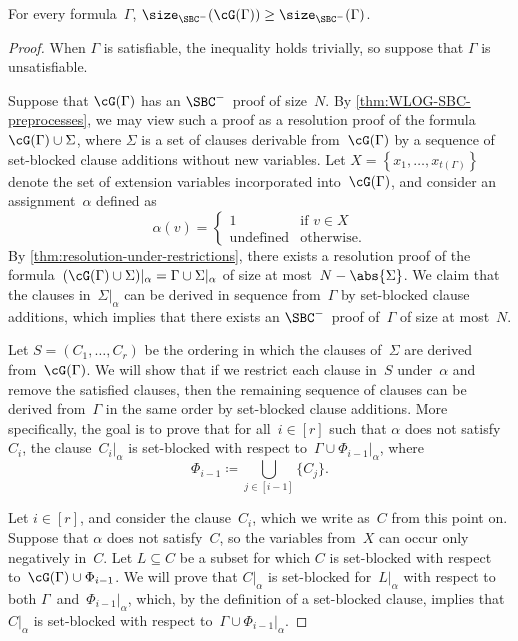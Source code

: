 \documentclass[10pt,a4paper]{article}
\begin{document}
\begin{lemma}\label{thm:projection-hard-for-SBC}
  For every formula~$\Gamma$,
  $\size_{\SBC^-}(\cG(\Gamma)) \geq \size_{\SBC^-}(\Gamma)$.
\end{lemma}
\begin{proof}
  When $\Gamma$ is satisfiable, the inequality holds trivially,
  so suppose that $\Gamma$ is unsatisfiable.

  Suppose that $\cG(\Gamma)$ has an $\SBC^-$~proof of size~$N$.
  By \cref{thm:WLOG-SBC-preprocesses}, we may view such a proof
  as a resolution proof of the formula~$\cG(\Gamma) \cup \Sigma$,
  where $\Sigma$ is a set of clauses derivable from~$\cG(\Gamma)$
  by a sequence of set-blocked clause additions without new variables.
  Let $X = \left\{x_1, \dots, x_{t(\Gamma)}\right\}$
  denote the set of extension variables incorporated into~$\cG(\Gamma)$,
  and consider an assignment~$\alpha$ defined as
  \begin{equation*}
    \alpha(v) =
    \begin{cases}
      1 & \text{if } v \in X \\
      \text{undefined} & \text{otherwise}.
    \end{cases}
  \end{equation*}
  By \cref{thm:resolution-under-restrictions}, there exists a resolution proof
  of the formula~$(\cG(\Gamma) \cup \Sigma)|_\alpha = \Gamma \cup \Sigma|_\alpha$
  of size at most~$N - \abs{\Sigma}$.
  We claim that the clauses in~$\Sigma|_\alpha$ can be derived
  in sequence from~$\Gamma$ by set-blocked clause additions,
  which implies that there exists
  an $\SBC^-$~proof of~$\Gamma$ of size at most~$N$.

  Let $S = (C_1, \dots, C_r)$ be the ordering in which
  the clauses of~$\Sigma$ are derived from~$\cG(\Gamma)$.
  We will show that if we restrict each clause in~$S$ under~$\alpha$
  and remove the satisfied clauses, then the remaining sequence of clauses
  can be derived from~$\Gamma$ in the same order by set-blocked clause additions.
  More specifically, the goal is to prove that for all~$i \in [r]$
  such that $\alpha$ does not satisfy~$C_i$,
  the clause~$C_i|_\alpha$ is set-blocked
  with respect to~$\Gamma \cup \Phi_{i - 1}|_\alpha$, where
  \begin{equation*}
    \Phi_{i - 1} \coloneqq \bigcup_{j \in [i - 1]} \{C_j\}.
  \end{equation*}

  Let $i \in [r]$, and consider the clause~$C_i$,
  which we write as~$C$ from this point on.
  Suppose that $\alpha$ does not satisfy~$C$,
  so the variables from~$X$ can occur only negatively in~$C$.
  Let $L \subseteq C$ be a subset for which $C$ is set-blocked
  with respect to~$\cG(\Gamma) \cup \Phi_{i - 1}$.
  We will prove that $C|_\alpha$ is set-blocked for~$L|_\alpha$
  with respect to both $\Gamma$~and~$\Phi_{i - 1}|_\alpha$,
  which, by the definition of a set-blocked clause,
  implies that $C|_\alpha$ is set-blocked
  with respect to~$\Gamma \cup \Phi_{i - 1}|_\alpha$.


\end{proof}
\end{document}
